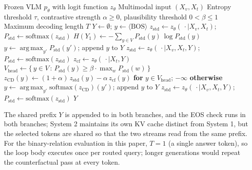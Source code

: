 \documentclass[pdflatex,sn-basic,Numbered]{sn-jnl}
\theoremstyle{thmstyleone}
\theoremstyle{thmstyletwo}
\theoremstyle{thmstylethree}
\begin{document}
\begin{algorithm}
\caption{Entropy-Gated Contrastive Decoding (EGCD)}\label{alg:egcd}
\begin{algorithmic}[1]
\Require Frozen VLM $p_{\theta}$ with logit function $z_{\theta}$
\Require Multimodal input $(X_{v}, X_{t})$
\Require Entropy threshold $\tau$, contrastive strength $\alpha \geq 0$, plausibility threshold $0 < \beta \leq 1$
\Require Maximum decoding length $T$
\State $Y \leftarrow \emptyset$; \; $y \leftarrow \langle\text{BOS}\rangle$ 
\State $z_{\text{std}} \leftarrow z_{\theta}(\,\cdot \mid X_{v}, X_{t})$; \; $P_{\text{std}} \leftarrow \text{softmax}(z_{\text{std}})$ 
\State $H(Y_{1}) \leftarrow -\sum_{y \in V} P_{\text{std}}(y)\, \log P_{\text{std}}(y)$
 
    \State $y \leftarrow \operatorname*{arg\,max}_{y'} P_{\text{std}}(y')$; \; append $y$ to $Y$
     
      \State $z_{\text{std}} \leftarrow z_{\theta}(\,\cdot \mid X_{v}, X_{t}, Y)$; \; $P_{\text{std}} \leftarrow \text{softmax}(z_{\text{std}})$
    \EndIf
  \EndWhile
\Else {}
    \State $z_{\text{cf}} \leftarrow z_{\theta}(\,\cdot \mid X_{t}, Y)$ 
    \State $V_{\text{head}} \leftarrow \{\, y \in V \,:\, P_{\text{std}}(y) \geq \beta \cdot \max_{w} P_{\text{std}}(w)\,\}$
    \State $z_{\text{CD}}(y) \leftarrow (1 + \alpha)\, z_{\text{std}}(y) - \alpha\, z_{\text{cf}}(y)$ \textbf{for} $y \in V_{\text{head}}$; $-\infty$ \textbf{otherwise}
    \State $y \leftarrow \operatorname*{arg\,max}_{y'} \text{softmax}(z_{\text{CD}})(y')$; \; append $y$ to $Y$
      \State $z_{\text{std}} \leftarrow z_{\theta}(\,\cdot \mid X_{v}, X_{t}, Y)$; \; $P_{\text{std}} \leftarrow \text{softmax}(z_{\text{std}})$
    \EndIf
  \EndWhile
\EndIf
\State \Return $Y$
\end{algorithmic}
\end{algorithm}

The shared prefix $Y$ is appended to in both branches, and the EOS check runs in both branches; System 2 maintains its own KV cache distinct from System 1, but the selected tokens are shared so that the two streams read from the same prefix. For the binary-relation evaluation in this paper, $T = 1$ (a single answer token), so the loop body executes once per routed query; longer generations would repeat the counterfactual pass at every token.
\end{document}
